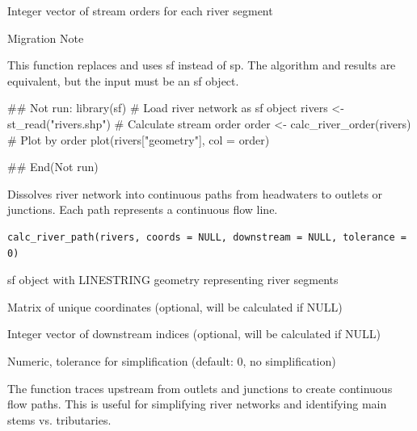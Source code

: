 \documentclass[a4paper]{book}
\begin{document}
%
\begin{Value}
Integer vector of stream orders for each river segment
\end{Value}
%
\begin{Section}{Migration Note}

This function replaces  and uses sf instead of sp.
The algorithm and results are equivalent, but the input must be an sf object.
\end{Section}
%
\begin{Examples}
\begin{ExampleCode}
## Not run: 
library(sf)
# Load river network as sf object
rivers <- st_read("rivers.shp")
# Calculate stream order
order <- calc_river_order(rivers)
# Plot by order
plot(rivers["geometry"], col = order)

## End(Not run)
\end{ExampleCode}
\end{Examples}
%
\begin{Description}\relax
Dissolves river network into continuous paths from headwaters to outlets
or junctions. Each path represents a continuous flow line.
\end{Description}
%
\begin{Usage}
\begin{verbatim}
calc_river_path(rivers, coords = NULL, downstream = NULL, tolerance = 0)
\end{verbatim}
\end{Usage}
%
\begin{Arguments}
\begin{ldescription}
\item[\code{rivers}] sf object with LINESTRING geometry representing river segments

\item[\code{coords}] Matrix of unique coordinates (optional, will be calculated if NULL)

\item[\code{downstream}] Integer vector of downstream indices (optional, will be calculated if NULL)

\item[\code{tolerance}] Numeric, tolerance for simplification (default: 0, no simplification)
\end{ldescription}
\end{Arguments}
%
\begin{Details}\relax
The function traces upstream from outlets and junctions to create continuous
flow paths. This is useful for simplifying river networks and identifying
main stems vs. tributaries.
\end{Details}
\end{document}
